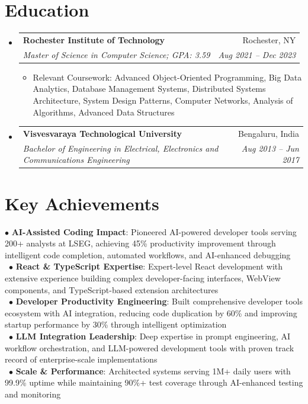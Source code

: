 \documentclass[a4paper,11pt]{article}
\makeatletter
\newcommand{\resumeItem}[1]{
  \item\small{
    {#1 \vspace{-2pt}}
  }
}
\newcommand{\resumeSubheading}[4]{
  \vspace{-2pt}\item
    \begin{tabular*}{0.97\textwidth}[t]{l@{\extracolsep{\fill}}r}
      \textbf{#1} & #2 \\
      \textit{\small#3} & \textit{\small #4} \\
    \end{tabular*}\vspace{-7pt}
}
\newcommand{\resumeSubHeadingListStart}{\begin{itemize}[leftmargin=0.15in, label={}]}
\newcommand{\resumeSubHeadingListEnd}{\end{itemize}}
\newcommand{\resumeItemListStart}{\begin{itemize}}
\newcommand{\resumeItemListEnd}{\end{itemize}\vspace{-5pt}}
\makeatother
\begin{document}
\section{Education}
  \resumeSubHeadingListStart
    \resumeSubheading
      {Rochester Institute of Technology}{Rochester, NY}
      {Master of Science in Computer Science; GPA: 3.59}{Aug 2021 -- Dec 2023}
      \resumeItemListStart
        \resumeItem{Relevant Coursework: Advanced Object-Oriented Programming, Big Data Analytics, Database Management Systems, Distributed Systems Architecture, System Design Patterns, Computer Networks, Analysis of Algorithms, Advanced Data Structures}
      \resumeItemListEnd
    \resumeSubheading
      {Visvesvaraya Technological University}{Bengaluru, India}
      {Bachelor of Engineering in Electrical, Electronics and Communications Engineering}{Aug 2013 -- Jun 2017}
  \resumeSubHeadingListEnd

\section{Key Achievements}
 \begin{itemize}[leftmargin=0.15in, label={}]
    \small{\item{
     $\bullet$ \textbf{AI-Assisted Coding Impact}: Pioneered AI-powered developer tools serving 200+ analysts at LSEG, achieving 45\% productivity improvement through intelligent code completion, automated workflows, and AI-enhanced debugging \\\
     $\bullet$ \textbf{React \& TypeScript Expertise}: Expert-level React development with extensive experience building complex developer-facing interfaces, WebView components, and TypeScript-based extension architectures \\\
     $\bullet$ \textbf{Developer Productivity Engineering}: Built comprehensive developer tools ecosystem with AI integration, reducing code duplication by 60\% and improving startup performance by 30\% through intelligent optimization \\\
     $\bullet$ \textbf{LLM Integration Leadership}: Deep expertise in prompt engineering, AI workflow orchestration, and LLM-powered development tools with proven track record of enterprise-scale implementations \\\
     $\bullet$ \textbf{Scale \& Performance}: Architected systems serving 1M+ daily users with 99.9\% uptime while maintaining 90\%+ test coverage through AI-enhanced testing and monitoring
    }}
 \end{itemize}
\end{document}
